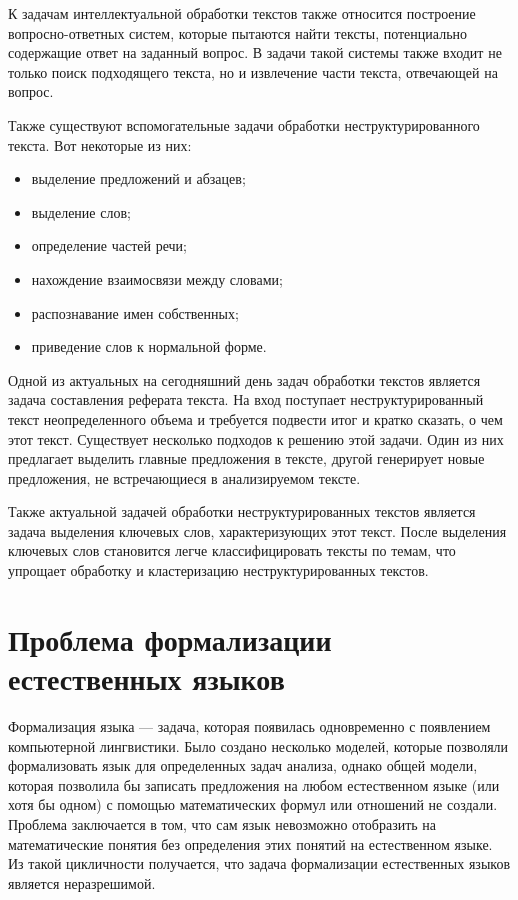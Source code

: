 К задачам интеллектуальной обработки текстов также относится построение вопросно-ответных систем, которые пытаются найти тексты, потенциально содержащие ответ на заданный вопрос. В задачи такой системы также входит не только поиск подходящего текста, но и извлечение части текста, отвечающей на вопрос.

Также существуют вспомогательные задачи обработки неструктурированного текста. Вот некоторые из них:
\begin{itemize}
    \item выделение предложений и абзацев;
    \item выделение слов;
    \item определение частей речи;
    \item нахождение взаимосвязи между словами;
    \item распознавание имен собственных;
    \item приведение слов к нормальной форме.
\end{itemize}

Одной из актуальных на сегодняшний день задач обработки текстов является задача составления реферата текста. На вход поступает неструктурированный текст неопределенного объема и требуется подвести итог и кратко сказать, о чем этот текст. Существует несколько подходов к решению этой задачи. Один из них предлагает выделить главные предложения в тексте, другой генерирует новые предложения, не встречающиеся в анализируемом тексте.

Также актуальной задачей обработки неструктурированных текстов является задача выделения ключевых слов, характеризующих этот текст. После выделения ключевых слов становится легче классифицировать тексты по темам, что упрощает обработку и кластеризацию неструктурированных текстов.

\section{Проблема формализации естественных языков}

Формализация языка --- задача, которая появилась одновременно с появлением компьютерной лингвистики. Было создано несколько моделей, которые позволяли формализовать язык для определенных задач анализа, однако общей модели, которая позволила бы записать предложения на любом естественном языке (или хотя бы одном) с помощью математических формул или отношений не создали. Проблема заключается в том, что сам язык невозможно отобразить на математические понятия без определения этих понятий на естественном языке. Из такой цикличности получается, что задача формализации естественных языков является неразрешимой.

